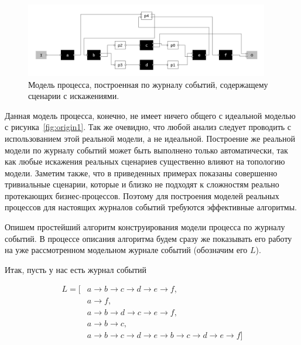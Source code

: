 \documentclass[
11pt,%
tightenlines,%
twoside,%
onecolumn,%
nofloats,%
nobibnotes,%
nofootinbib,%
superscriptaddress,%
noshowpacs,%
centertags]%
{revtex4}
\begin{document}
\begin{figure}[h]
\setcaptionmargin{5mm}
\includegraphics[width=0.95\textwidth]{pics/third1.png}
\caption{Модель процесса, построенная по журналу событий, содержащему сценарии с искажениями.}
\label{fig:third1}
\end{figure}

Данная модель процесса, конечно, не имеет ничего общего с идеальной моделью с рисунка~\ref{fig:origin1}.
Так же очевидно, что любой анализ следует проводить с использованием этой реальной модели, а не идеальной.
Построение же реальной модели по журналу событий может быть выполнено только автоматически, так как любые искажения реальных сценариев существенно влияют на топологию модели.
Заметим также, что в приведенных примерах показаны совершенно тривиальные сценарии, которые и близко не подходят к сложностям реально протекающих бизнес-процессов.
Поэтому для построения моделей реальных процессов для настоящих журналов событий требуются эффективные алгоритмы.

Опишем простейший алгоритм конструирования модели процесса по журналу событий.
В процессе описания алгоритма будем сразу же показывать его работу на уже рассмотренном модельном журнале событий (обозначим его $L$).

Итак, пусть у нас есть журнал событий

\begin{equation}
\begin{aligned}
L = [
&{a \rightarrow b \rightarrow c \rightarrow d \rightarrow e \rightarrow f},\\
&{a \rightarrow f},\\
&{a \rightarrow b \rightarrow d \rightarrow c \rightarrow e \rightarrow f},\\
&{a \rightarrow b \rightarrow c},\\
&{a \rightarrow b \rightarrow c \rightarrow d \rightarrow e \rightarrow b \rightarrow c \rightarrow d \rightarrow e \rightarrow f}
]
\end{aligned}
\end{equation}
\end{document}
